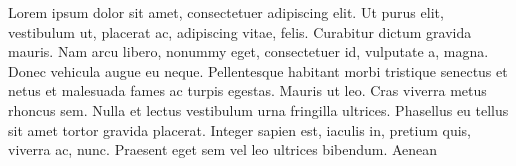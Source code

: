 \documentclass[english]{hisspik}
\begin{document}
%
\begin{spik}%
Lorem ipsum dolor sit amet, consectetuer adipiscing elit. Ut
purus elit, vestibulum ut, placerat ac, adipiscing vitae, felis.
Curabitur dictum gravida mauris. Nam arcu libero, nonummy
eget, consectetuer id, vulputate a, magna. Donec vehicula
augue eu neque. Pellentesque habitant morbi tristique senectus
et netus et malesuada fames ac turpis egestas. Mauris ut leo.
Cras viverra metus rhoncus sem. Nulla et lectus vestibulum
urna fringilla ultrices. Phasellus eu tellus sit amet tortor gravida
placerat. Integer sapien est, iaculis in, pretium quis, viverra
ac, nunc. Praesent eget sem vel leo ultrices bibendum. Aenean%
\end{spik}%
\end{document}
